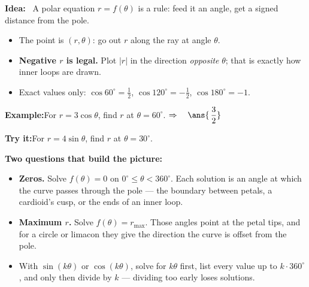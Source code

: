 \documentclass[12pt]{article}
\begin{document}


\begin{formulabox}
\textbf{Idea:} \ A polar equation $r = f(\theta)$ is a rule: feed it an angle, get a
signed distance from the pole.
\begin{itemize}[leftmargin=0.8cm, itemsep=1pt, topsep=2pt]
  \item The point is $(r, \theta)$: go out $r$ along the ray at angle $\theta$.
  \item \textbf{Negative $r$ is legal.} Plot $|r|$ in the direction \emph{opposite}
        $\theta$; that is exactly how inner loops are drawn.
  \item Exact values only: $\cos 60^\circ = \tfrac{1}{2}$,
        $\cos 120^\circ = -\tfrac{1}{2}$, $\cos 180^\circ = -1$.
\end{itemize}
\end{formulabox}

\begin{examplebox}
\textbf{Example:}\quad For $r = 3\cos\theta$, find $r$ at $\theta = 60^\circ$.
$\Rightarrow\quad \ans{\,\dfrac{3}{2}}$
\end{examplebox}

\begin{tryitbox}
\textbf{Try it:}\quad For $r = 4\sin\theta$, find $r$ at $\theta = 30^\circ$.\\[2pt]
\end{tryitbox}


\begin{formulabox}
\textbf{Two questions that build the picture:}
\begin{itemize}[leftmargin=0.8cm, itemsep=1pt, topsep=2pt]
  \item \textbf{Zeros.} Solve $f(\theta) = 0$ on $0^\circ \le \theta < 360^\circ$.
        Each solution is an angle at which the curve passes through the pole ---
        the boundary between petals, a cardioid's cusp, or the ends of an inner loop.
  \item \textbf{Maximum $r$.} Solve $f(\theta) = r_{\max}$. Those angles point at the
        petal tips, and for a circle or limacon they give the direction the curve is
        offset from the pole.
  \item With $\sin(k\theta)$ or $\cos(k\theta)$, solve for $k\theta$ first, list every
        value up to $k \cdot 360^\circ$, and only then divide by $k$ --- dividing too
        early loses solutions.
\end{itemize}
\end{formulabox}
\end{document}
